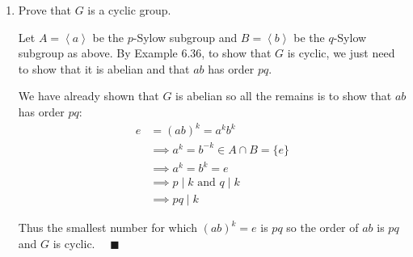 \documentclass[12pt]{article}
\newcommand{\qed}{\quad \blacksquare}
\newcommand{\brak}[1]{\left\langle #1 \right\rangle}
\begin{document}
\begin{enumerate}
        \color{black}

    \item Prove that $G$ is a cyclic group.

        \color{blue}
            Let $A = \brak{a}$ be the $p$-Sylow subgroup and $B = \brak{b}$ be the $q$-Sylow subgroup as above. By Example 6.36, to show that $G$ is cyclic, we just need to show that it is abelian and that $ab$ has order $pq$. 

            We have already shown that $G$ is abelian so all the remains is to show that $ab$ has order $pq$: 
            \begin{align*}
                e &= (ab)^k = a^kb^k\\
                &\implies a^k = b^{-k} \in A \cap B = \{e\} \\
                &\implies a^k = b^k = e \\
                &\implies p \mid k \text{ and } q \mid k \\
                &\implies pq \mid k
            \end{align*}

            Thus the smallest number for which $(ab)^k = e$ is $pq$ so the order of $ab$ is $pq$ and $G$ is cyclic. $\qed$ 
        \color{black}

\end{enumerate}

\pagebreak
\end{document}
